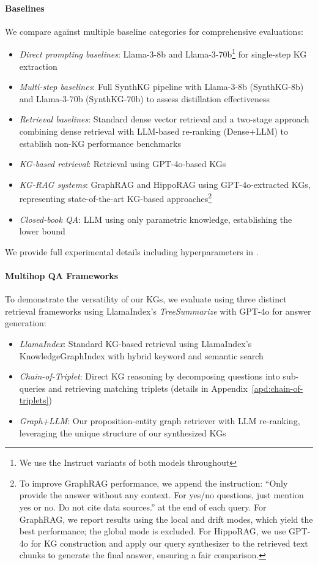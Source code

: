 \documentclass{article} %
\newcommand{\synthLlama}{\textrm{SynthKG-8b}}
\begin{document}
\paragraph{Baselines}
We compare against multiple baseline categories for comprehensive evaluations:
\begin{itemize}[noitemsep,leftmargin=*]
\item \textit{Direct prompting baselines}: Llama-3-8b and Llama-3-70b\footnote{We use the Instruct variants of both models throughout} for single-step KG extraction
\item \textit{Multi-step baselines}: Full SynthKG pipeline with Llama-3-8b (\synthLlama) and Llama-3-70b (SynthKG-70b) to assess distillation effectiveness
\item \textit{Retrieval baselines}: Standard dense vector retrieval and a two-stage approach combining dense retrieval with LLM-based re-ranking (Dense+LLM) to establish non-KG performance benchmarks
\item \textit{KG-based retrieval}: Retrieval using GPT-4o-based KGs
\item \textit{KG-RAG systems}: GraphRAG and HippoRAG using GPT-4o-extracted KGs, representing state-of-the-art KG-based approaches\footnote{To improve GraphRAG performance, we append the instruction: ``Only provide the answer without any context. For yes/no questions, just mention yes or no. Do not cite data sources.'' at the end of each query. For GraphRAG, we report results using the local and drift modes, which yield the best performance; the global mode is excluded. For HippoRAG, we use GPT-4o for KG construction and apply our query synthesizer to the retrieved text chunks to generate the final answer, ensuring a fair comparison.}
\item \textit{Closed-book QA}: LLM using only parametric knowledge, establishing the lower bound
\end{itemize}
We provide full experimental details including hyperparameters in .

\paragraph{Multihop QA Frameworks} 
To demonstrate the versatility of our KGs, we evaluate using three distinct retrieval frameworks using LlamaIndex's \textit{TreeSummarize} with GPT-4o for answer generation:
\begin{itemize}[noitemsep,leftmargin=*]
\setlength\itemsep{0.001em}
    \item \textit{LlamaIndex}: Standard KG-based retrieval using LlamaIndex's KnowledgeGraphIndex with hybrid keyword and semantic search
    \item \textit{Chain-of-Triplet}: Direct KG reasoning by decomposing questions into sub-queries and retrieving matching triplets (details in Appendix~\ref{apd:chain-of-triplets})
    \item \textit{Graph+LLM}: Our proposition-entity graph retriever with LLM re-ranking, leveraging the unique structure of our synthesized KGs
\end{itemize}
\end{document}
